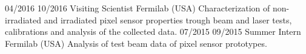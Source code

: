     \position
      {04/2016 \textemdash{} 10/2016}
      {Visiting Scientist}
      {Fermilab (USA)}
      {Characterization of non-irradiated and irradiated pixel sensor properties trough beam and laser tests, calibrations and analysis of the collected data.}
    \position
      {07/2015 \textemdash{} 09/2015}
      {Summer Intern}
      {Fermilab (USA)}
      {Analysis of test beam data of pixel sensor prototypes.}
\fi
